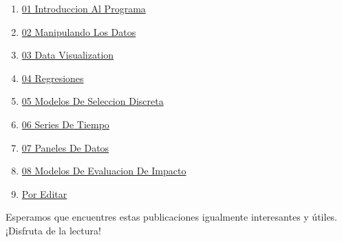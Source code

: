 \documentclass[
  jou,
  floatsintext,
  longtable,
  a4paper,
  nolmodern,
  notxfonts,
  notimes,
  colorlinks=true,linkcolor=blue,citecolor=blue,urlcolor=blue]{apa7}
\providecommand{\tightlist}{%
  \setlength{\itemsep}{0pt}\setlength{\parskip}{0pt}}
\begin{document}
\begin{enumerate}
\def\labelenumi{\arabic{enumi}.}
\tightlist
\item
  \href{https://achalmaedison.netlify.app/programacion-software/stata/2022-05-30-01-introduccion-al-programa/index.pdf}{}
  \href{https://achalmaedison.netlify.app/programacion-software/stata/2022-05-30-01-introduccion-al-programa}{01
  Introduccion Al Programa}
\item
  \href{https://achalmaedison.netlify.app/programacion-software/stata/2022-06-06-02-manipulando-los-datos/index.pdf}{}
  \href{https://achalmaedison.netlify.app/programacion-software/stata/2022-06-06-02-manipulando-los-datos}{02
  Manipulando Los Datos}
\item
  \href{https://achalmaedison.netlify.app/programacion-software/stata/2022-06-13-03-data-visualization/index.pdf}{}
  \href{https://achalmaedison.netlify.app/programacion-software/stata/2022-06-13-03-data-visualization}{03
  Data Visualization}
\item
  \href{https://achalmaedison.netlify.app/programacion-software/stata/2022-06-20-04-regresiones/index.pdf}{}
  \href{https://achalmaedison.netlify.app/programacion-software/stata/2022-06-20-04-regresiones}{04
  Regresiones}
\item
  \href{https://achalmaedison.netlify.app/programacion-software/stata/2022-06-27-05-modelos-de-seleccion-discreta/index.pdf}{}
  \href{https://achalmaedison.netlify.app/programacion-software/stata/2022-06-27-05-modelos-de-seleccion-discreta}{05
  Modelos De Seleccion Discreta}
\item
  \href{https://achalmaedison.netlify.app/programacion-software/stata/2022-07-04-06-series-de-tiempo/index.pdf}{}
  \href{https://achalmaedison.netlify.app/programacion-software/stata/2022-07-04-06-series-de-tiempo}{06
  Series De Tiempo}
\item
  \href{https://achalmaedison.netlify.app/programacion-software/stata/2022-07-11-07-paneles-de-datos/index.pdf}{}
  \href{https://achalmaedison.netlify.app/programacion-software/stata/2022-07-11-07-paneles-de-datos}{07
  Paneles De Datos}
\item
  \href{https://achalmaedison.netlify.app/programacion-software/stata/2022-07-18-08-modelos-de-evaluacion-de-impacto/index.pdf}{}
  \href{https://achalmaedison.netlify.app/programacion-software/stata/2022-07-18-08-modelos-de-evaluacion-de-impacto}{08
  Modelos De Evaluacion De Impacto}
\item
  \href{https://achalmaedison.netlify.app/programacion-software/stata/2024-03-31-por-editar/index.pdf}{}
  \href{https://achalmaedison.netlify.app/programacion-software/stata/2024-03-31-por-editar}{Por
  Editar}
\end{enumerate}

Esperamos que encuentres estas publicaciones igualmente interesantes y
útiles. ¡Disfruta de la lectura!
\end{document}
